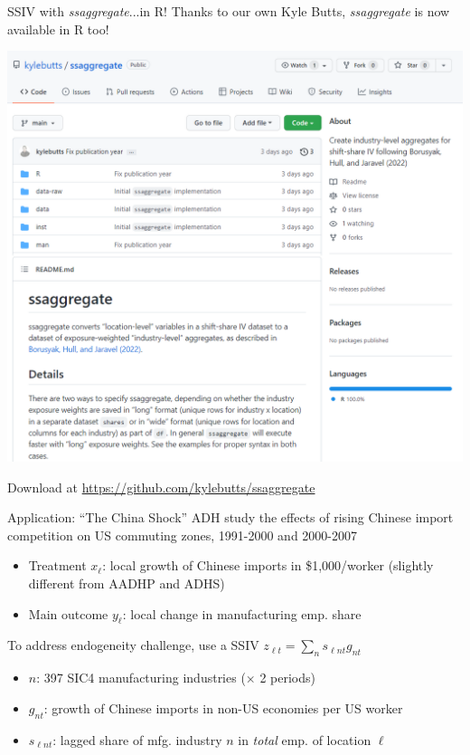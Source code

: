 \documentclass{beamer}
\begin{document}
\begin{frame}{SSIV with \emph{ssaggregate}...in R!}
\vspace{-0.4cm}
Thanks to our own Kyle Butts, \emph{ssaggregate} is now available in R too!

\begin{center}
\includegraphics[height=0.7\textheight]{lecture_includes/ssaggregate_R.png}
\end{center}

Download at \url{https://github.com/kylebutts/ssaggregate}

\end{frame}

\begin{frame}{Application: ``The China Shock''} 
ADH study the effects of rising Chinese import competition on US commuting zones, 1991-2000 and 2000-2007
\smallskip
	\begin{itemize}
	\item Treatment $x_\ell$: local growth of Chinese imports  in \$1,000/worker (slightly different from AADHP and ADHS)\smallskip
	\item Main outcome $y_\ell$: local change in manufacturing emp. share
	\end{itemize}
	\pause{}\medskip
To address endogeneity challenge, use a SSIV $z_{\ell t}=\sum_n s_{\ell nt} g_{nt}$\smallskip
	\begin{itemize}
	\item $n$: 397 SIC4 manufacturing industries ($\times$ 2 periods)\smallskip
	\item $g_{nt}$: growth of Chinese imports in non-US economies per US worker \smallskip
	\item $s_{\ell nt}$: lagged share of mfg. industry $n$ in \emph{total} emp. of location $\ell$
	\end{itemize}
\end{frame}
\end{document}
